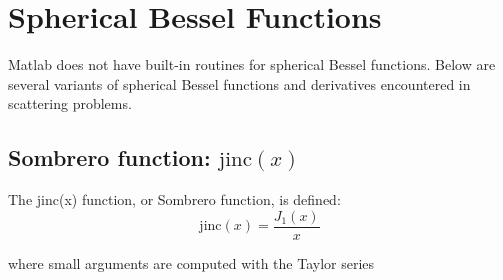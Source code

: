 
\section{Spherical Bessel Functions}

\label{sphericalbess}
Matlab does not have built-in routines for spherical Bessel functions. Below are several variants of spherical Bessel functions and derivatives encountered in scattering problems.



\subsection{Sombrero function: $\textrm{jinc}(x)$}

The \textrm{jinc}(x) function, or Sombrero function, is defined:
\begin{equation}
\textrm{jinc}(x) = \dfrac{J_1(x)}{x}
\end{equation}
%

\noindent where small arguments are computed with the Taylor series 

{\footnotesize
{}
}


